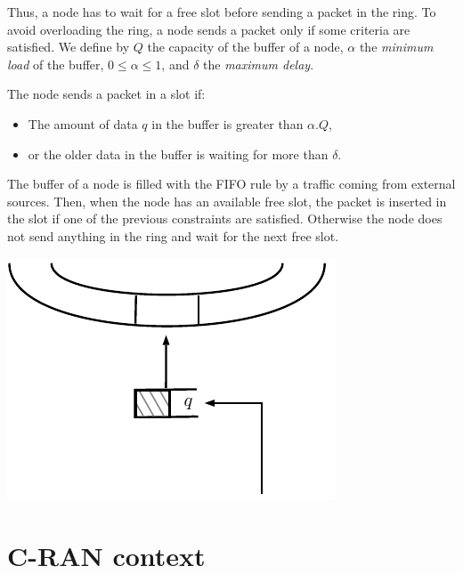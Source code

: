 \documentclass[a4paper,10pt]{article}
\begin{document}


Thus, a node has to wait for a free slot before sending a packet in the ring. To avoid overloading the ring, a node sends a packet only if some criteria  are satisfied.
We define by $Q$ the capacity of the buffer of a node, $\alpha$ the {\em minimum load} of the buffer, $0 \leq  \alpha \leq 1$, and $\delta$ the {\em maximum delay}.

The node sends a packet in a slot if:
\begin{itemize}
 \item The amount of data $q$ in the buffer is greater than $\alpha . Q$,
 \item or the older data in the buffer is waiting for more than $\delta$.
\end{itemize}

The buffer of a node is filled with the FIFO rule by a traffic coming from external sources. Then, when the node has an available free slot, the packet is inserted in the slot if one of the previous constraints are satisfied. Otherwise the node does not send anything in the ring and wait for the next free slot.

\begin{center}   

      \includegraphics[scale=0.7]{insertion0.pdf}

  
\end{center}

\section{C-RAN context}
\end{document}
